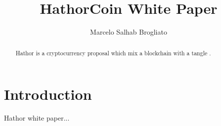 \documentclass[12pt]{article}
\title{HathorCoin White Paper}
\author{Marcelo Salhab Brogliato}
\begin{document}
\maketitle

\begin{abstract}
Hathor is a cryptocurrency proposal which mix a blockchain \citep{nakamoto2008bitcoin} with a tangle \citep{tangle2016}.
\end{abstract}

\section{Introduction}
Hathor white paper...

\medskip



\end{document}
